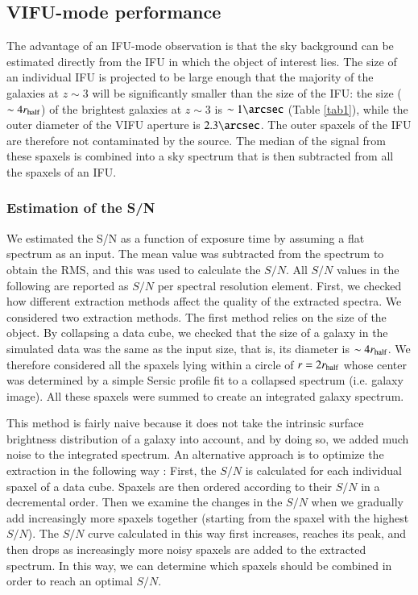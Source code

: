 \documentclass{aa}
\begin{document}
\subsection{VIFU-mode performance}

The advantage of an IFU-mode observation is that the sky background can be estimated directly from the IFU in which the object of interest lies. The size of an individual IFU is projected to be large enough that the majority of the galaxies at $z \sim 3$ will be significantly smaller than the size of the IFU: the size ($\sim 4r_{\rm half}$) of the brightest galaxies at $z \sim 3$ is $\sim 1\arcsec$ (Table \ref{tab1}), while the outer diameter of the VIFU aperture is $2.3\arcsec$. The outer spaxels of the IFU are therefore not contaminated by the source. The median of the signal from these spaxels is combined into a sky spectrum that is then subtracted from all the spaxels of an IFU.

\subsubsection{Estimation of the S/N}
\label{snsn}

We estimated the S/N as a function of exposure time by assuming a flat spectrum as an input. The mean value was subtracted from the spectrum to obtain the RMS, and this was used to calculate the $S/N$. All $S/N$ values in the following are reported as $S/N$ per spectral resolution element. First, we checked how different extraction methods affect the quality of the extracted spectra. We considered two extraction methods. The first method relies on the size of the object. By collapsing a data cube, we checked that the size of a galaxy in the simulated data was the same as the input size, that is, its diameter is $\sim 4r_{\rm half}$. We therefore considered all the spaxels lying within a circle of $r = 2r_{\rm half}$ whose center was determined by a simple Sersic profile fit to a collapsed spectrum (i.e. galaxy image). All these spaxels were summed to create an integrated galaxy spectrum.

This method is fairly naive because it does not take the intrinsic surface brightness distribution of a galaxy into account, and by doing so, we added much noise to the integrated spectrum. An alternative approach is to optimize the extraction in the following way \citep{RosalesOrtega2012}: First, the $S/N$ is calculated for each individual spaxel of a data cube. Spaxels are then ordered according to their $S/N$ in a decremental order. Then we examine the changes in the $S/N$  when we gradually add increasingly more spaxels together (starting from the spaxel with the highest $S/N$). The $S/N$ curve calculated in this way first increases, reaches its peak, and then drops as increasingly more noisy spaxels are added to the extracted spectrum. In this way, we can determine which spaxels should be combined in order to reach an optimal $S/N$. 
\end{document}
